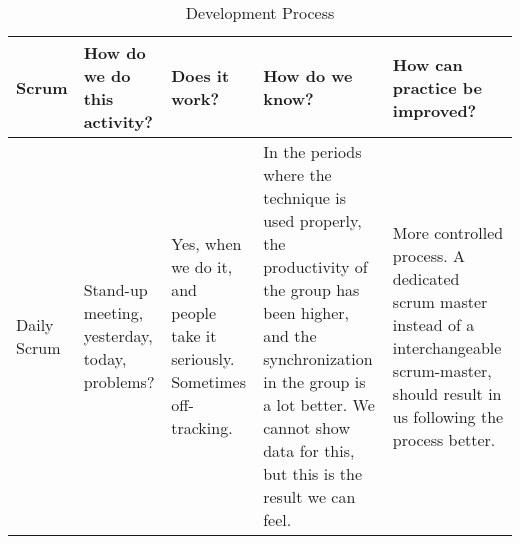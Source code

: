 \begin{sidewaystable}[]
\centering
\caption{Development Process}
\label{tab:dev-process-eval}
\begin{tabularx}{\textwidth}{|l|X|X|X|X|}
\hline
Scrum
& How do we do this activity?                                                                                                                                                                             & Does it work?                                                                                                                                                                                                                                                                              & How do we know?                                                                                                                                                                                                                                                                                                                                                                                                                                         & How can practice be improved?                                                                                                                                                                                                                                                                \\ \hline
Daily Scrum                 
& Stand-up meeting, yesterday, today, problems?                                                                                                                                                           
& Yes, when we do it, and people take it seriously. Sometimes off-tracking.                                                                                                                                                                                                                   
& In the periods where the technique is used properly, the productivity of the group has been higher, and the synchronization in the group is a lot better. We cannot show data for this, but this is the result we can feel.                                                                                                                                                                                                                             & More controlled process. A dedicated scrum master instead of a interchangeable scrum-master, should result in us following the process better.                                                                                                                                                \\ \hline

\end{tabularx}
\end{sidewaystable}
